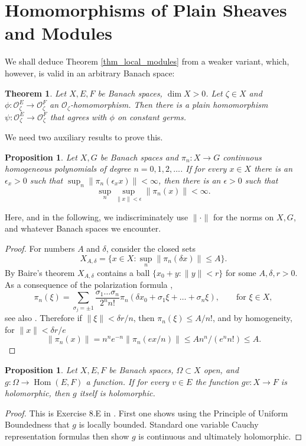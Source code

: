 \documentclass{amsart}
\numberwithin{equation}{section}
\theoremstyle{definition}
\theoremstyle{plain}
\newtheorem{proposition}[definition]{Proposition}
\newtheorem{theorem}[definition]{Theorem}
\theoremstyle{remark}
\begin{document}
\section{Homomorphisms of Plain Sheaves and Modules}
We shall deduce Theorem \ref{thm_local_modules} from a weaker variant,
which, however, is valid in an arbitrary Banach space:
\begin{theorem}\label{thm_local_partial}
Let $X,E,F$ be Banach spaces, $\dim X>0$. Let $\zeta\in X$ and
$\phi:{\ensuremath{\mathcal{{O}}}}^E_\zeta\rightarrow{\ensuremath{\mathcal{{O}}}}^F_\zeta$ an 
${\ensuremath{\mathcal{{O}}}}_\zeta$-homomorphism.
Then there is a plain homomorphism 
$\psi:{\ensuremath{\mathcal{{O}}}}^E_\zeta\rightarrow{\ensuremath{\mathcal{{O}}}}^F_\zeta$
that agrees with $\phi$ on constant germs.
\end{theorem}
We need two auxiliary results to prove this.
\begin{proposition}\label{prop_aux_local_partial_1}
Let $X,G$ be Banach spaces and $\pi_n:X\rightarrow G$ continuous homogeneous
polynomials of degree $n=0,1,2,\ldots$. If for every $x\in X$ there is
an $\epsilon_x>0$ such that $\sup_n \|\pi_n(\epsilon_xx)\|<\infty$,
then there is an $\epsilon >0$ such that 
\[
	\sup_n\sup_{\|x\|<\epsilon} \|\pi_n(x)\|<\infty.
\]
\end{proposition}
Here, and in the following, we indiscriminately use $\|\cdot\|$ for the
norms on $X,G$, and whatever Banach spaces we encounter.
\begin{proof}
For numbers $A$ and $\delta$, consider the closed sets
\[
X_{A,\delta}=\{x\in X:\sup_n\|\pi_n(\delta x)\|\leq A\}.
\]
By Baire's theorem $X_{A,\delta}$ contains a ball
$\{x_0+y:\|y\|<r\}$ for some $A,\delta,r>0$. As a consequence of the
polarization formula \cite[1:10]{mujica},
\[
\pi_n(\xi)=\sum_{\sigma_j=\pm 1} \frac{\sigma_1\ldots\sigma_n}{2^nn!}
	\pi_n(\delta x_0+\sigma_1\xi+\ldots+\sigma_n\xi), \qquad\text{for }\xi\in X,
\]
see also \cite[Exercise 2M]{mujica}. Therefore if $\|\xi\|<\delta r/n$, 
then
$\pi_n(\xi)\leq A/n!$, and by homogeneity, for $\|x\|<\delta r/e$
\[
\|\pi_n(x)\|=n^ne^{-n}\|\pi_n(ex/n)\|\leq An^n/(e^nn!)\leq A.
\]
\end{proof}

\begin{proposition}\label{prop_weakstar_holo_is_holo}
Let $X,E,F$ be Banach spaces, $\Omega\subset X$ open, and 
$g:\Omega\rightarrow{{\mathop{\mathrm{Hom}}}}(E,F)$ a function.
If for every $v\in E$ the function $gv:X\rightarrow F$ is holomorphic,
then $g$ itself is holomorphic.
\end{proposition}
\begin{proof}
This is Exercise 8.E in \cite{mujica}. First one shows using the Principle 
of Uniform Boundedness that $g$ is locally bounded. Standard one
variable
Cauchy representation formulas then show $g$ is continuous and 
ultimately holomorphic.
\end{proof}
\end{document}
